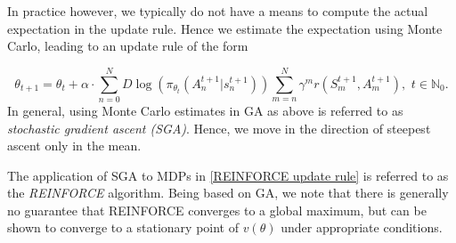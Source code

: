 In practice however, we typically do not have a means to compute the actual expectation in the update rule. Hence we estimate the expectation using Monte Carlo, leading to an update rule of the form

\begin{equation}\label{REINFORCE update rule}\tag{\textasteriskcentered}
     \theta_{t+1} = \theta_t + \alpha \cdot \sum_{ n = 0}^N D \log(\pi_{\theta_t}(A_n^{t+1} | s_n^{t+1})) \sum_{m=n}^N \gamma^m r(S_m^{t+1}, A_m^{t+1}), \,\, t \in \mathbb{N}_{0}.
\end{equation}
In general, using Monte Carlo estimates in GA as above is referred to as
\emph{stochastic gradient ascent (SGA)}. Hence, we move in the direction of steepest ascent only in the mean.

The application of SGA to MDPs in \eqref{REINFORCE update rule} is referred to as the \emph{REINFORCE} algorithm.
Being based on GA, we note that there is generally no guarantee that REINFORCE converges to a global maximum, but can be shown to converge to a stationary point of \( v(\theta) \) under appropriate conditions. 













